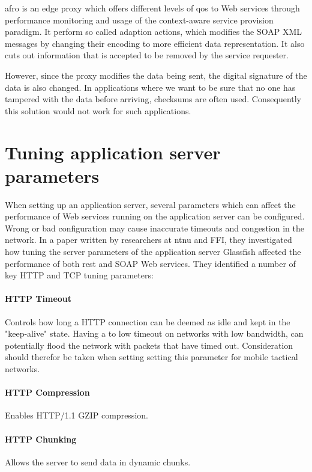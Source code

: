 \gls{afro} is an edge proxy which offers different levels of \gls{qos} to Web
services through performance monitoring and usage of the context-aware
service provision paradigm\cite{ist-090}. It perform so called adaption actions, which
modifies the SOAP XML messages by changing their encoding to more efficient data
representation. It also cuts out information that is accepted to be removed by
the service requester.

However, since the proxy modifies the data being sent, the digital signature of
the data is also changed. In applications where we want to be sure that no one
has tampered with the data before arriving, checksums are often used.
Consequently this solution would not work for such applications.


\section{Tuning application server parameters}

When setting up an application server, several parameters which can affect the
performance of Web services running on the application server can be configured.
Wrong or bad configuration may cause inaccurate timeouts and congestion in the
network. In a paper written by researchers at \gls{ntnu} and
FFI\cite{johnsen-bloebaum-recommendations-web-services-tactical-domain}, they
investigated how tuning the server parameters of the application server
Glassfish affected the performance of both \gls{rest} and SOAP Web services.
They identified a number of key HTTP and TCP tuning parameters:



\paragraph{HTTP Timeout} Controls how long a HTTP connection can be deemed as
idle and kept in the "keep-alive" state. Having a to low timeout on networks
with low bandwidth, can potentially flood the network with packets that have
timed out. Consideration should therefor be taken when setting setting this
parameter for mobile tactical networks.

\paragraph{HTTP Compression} Enables HTTP/1.1 GZIP compression.

\paragraph{HTTP Chunking} Allows the server to send data in dynamic chunks.

